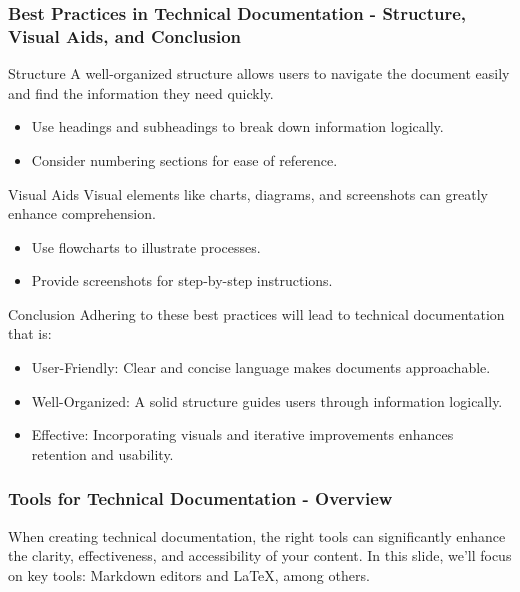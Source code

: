 \documentclass{beamer}
\begin{document}
\begin{frame}[fragile]
    \frametitle{Best Practices in Technical Documentation - Structure, Visual Aids, and Conclusion}
    \begin{block}{Structure}
        A well-organized structure allows users to navigate the document easily and find the information they need quickly.
        \begin{itemize}
            \item Use headings and subheadings to break down information logically.
            \item Consider numbering sections for ease of reference.
        \end{itemize}
    \end{block}
    
    \begin{block}{Visual Aids}
        Visual elements like charts, diagrams, and screenshots can greatly enhance comprehension.
        \begin{itemize}
            \item Use flowcharts to illustrate processes.
            \item Provide screenshots for step-by-step instructions.
        \end{itemize}
    \end{block}
    
    \begin{block}{Conclusion}
        Adhering to these best practices will lead to technical documentation that is:
        \begin{itemize}
            \item User-Friendly: Clear and concise language makes documents approachable.
            \item Well-Organized: A solid structure guides users through information logically.
            \item Effective: Incorporating visuals and iterative improvements enhances retention and usability.
        \end{itemize}
    \end{block}
\end{frame}

\begin{frame}[fragile]
    \frametitle{Tools for Technical Documentation - Overview}
    When creating technical documentation, the right tools can significantly enhance the clarity, effectiveness, and accessibility of your content. In this slide, we'll focus on key tools: Markdown editors and LaTeX, among others.
\end{frame}
\end{document}
